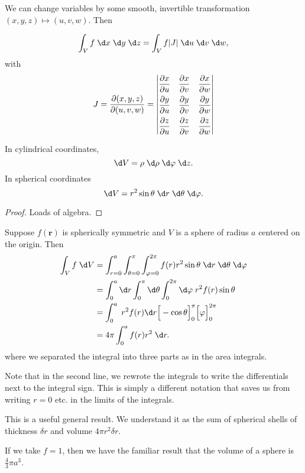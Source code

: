\documentclass[a4paper]{article}
\begin{document}
We can change variables by some smooth, invertible transformation $(x, y, z)\mapsto (u, v, w)$. Then
\begin{prop}
  \[
    \int_V f\;\d x\;\d y\;\d z = \int_V f|J|\;\d u\;\d v\;\d w,
  \]
  with
  \[
    J = \frac{\partial(x, y, z)}{\partial(u, v, w)} =
    \begin{vmatrix}
      \dfrac{\partial x}{\partial u} & \dfrac{\partial x}{\partial v} & \dfrac{\partial x}{\partial w}\vspace{5pt} \\
      \dfrac{\partial y}{\partial u} & \dfrac{\partial y}{\partial v} & \dfrac{\partial y}{\partial w}\vspace{5pt} \\
      \dfrac{\partial z}{\partial u} & \dfrac{\partial z}{\partial v} & \dfrac{\partial z}{\partial w}
    \end{vmatrix}
  \]
\end{prop}

\begin{prop}
  In cylindrical coordinates,
  \[
    \d V = \rho\;\d \rho\;\d \varphi\;\d z.
  \]
  In spherical coordinates
  \[
    \d V = r^2\sin\theta \;\d r\;\d \theta\;\d \varphi.
  \]
\end{prop}

\begin{proof}
  Loads of algebra.
\end{proof}

\begin{eg}
  Suppose $f(\mathbf{r})$ is spherically symmetric and $V$ is a sphere of radius $a$ centered on the origin. Then
  \begin{align*}
    \int_V f\;\d V &= \int_{r = 0}^a \int_{\theta = 0}^\pi \int_{\varphi = 0}^{2\pi} f(r)r^2 \sin\theta\;\d r\;\d \theta\;\d\varphi\\
    &= \int_0^a \d r\int_0^\pi \d \theta\int_0^{2\pi} \d \varphi \;r^2 f(r) \sin \theta\\
    &= \int_0^a \; r^2 f(r) \d r\Big[-\cos \theta\Big]_0^\pi \Big[\varphi\Big]_0^{2\pi}\\
    &= 4\pi\int_0^a f(r)r^2 \;\d r.
  \end{align*}
  where we separated the integral into three parts as in the area integrals.

  Note that in the second line, we rewrote the integrals to write the differentials next to the integral sign. This is simply a different notation that saves us from writing $r = 0$ etc. in the limits of the integrals.

  This is a useful general result. We understand it as the sum of spherical shells of thickness $\delta r$ and volume $4\pi r^2 \delta r$.

  If we take $f = 1$, then we have the familiar result that the volume of a sphere is $\frac{4}{3}\pi a^3$.
\end{eg}
\end{document}
